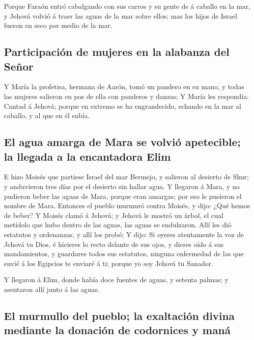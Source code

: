  Porque Faraón entró cabalgando con sus carros y su gente
de á caballo en la mar, y Jehová volvió á traer las aguas de la mar
sobre ellos; mas los hijos de Israel fueron en seco por medio de la mar.

\hypertarget{participaciuxf3n-de-mujeres-en-la-alabanza-del-seuxf1or}{%
\subsection{Participación de mujeres en la alabanza del
Señor}\label{participaciuxf3n-de-mujeres-en-la-alabanza-del-seuxf1or}}

 Y María la profetisa, hermana de Aarón, tomó un pandero
en su mano, y todas las mujeres salieron en pos de ella con panderos y
danzas;  Y María les respondía: Cantad á Jehová; porque
en extremo se ha engrandecido, echando en la mar al caballo, y al que en
él subía.

\hypertarget{el-agua-amarga-de-mara-se-volviuxf3-apetecible-la-llegada-a-la-encantadora-elim}{%
\subsection{El agua amarga de Mara se volvió apetecible; la llegada a la
encantadora
Elim}\label{el-agua-amarga-de-mara-se-volviuxf3-apetecible-la-llegada-a-la-encantadora-elim}}

 E hizo Moisés que partiese Israel del mar Bermejo, y
salieron al desierto de Shur; y anduvieron tres días por el desierto sin
hallar agua.  Y llegaron á Mara, y no pudieron beber las
aguas de Mara, porque eran amargas; por eso le pusieron el nombre de
Mara.  Entonces el pueblo murmuró contra Moisés, y dijo:
¿Qué hemos de beber?  Y Moisés clamó á Jehová; y Jehová
le mostró un árbol, el cual metídolo que hubo dentro de las aguas, las
aguas se endulzaron. Allí les dió estatutos y ordenanzas, y allí los
probó;  Y dijo: Si oyeres atentamente la voz de Jehová tu
Dios, é hicieres lo recto delante de sus ojos, y dieres oído á sus
mandamientos, y guardares todos sus estatutos, ninguna enfermedad de las
que envié á los Egipcios te enviaré á ti; porque yo soy Jehová tu
Sanador.

 Y llegaron á Elim, donde había doce fuentes de aguas, y
setenta palmas; y asentaron allí junto á las aguas.

\hypertarget{el-murmullo-del-pueblo-la-exaltaciuxf3n-divina-mediante-la-donaciuxf3n-de-codornices-y-manuxe1}{%
\subsection{El murmullo del pueblo; la exaltación divina mediante la
donación de codornices y
maná}\label{el-murmullo-del-pueblo-la-exaltaciuxf3n-divina-mediante-la-donaciuxf3n-de-codornices-y-manuxe1}}


